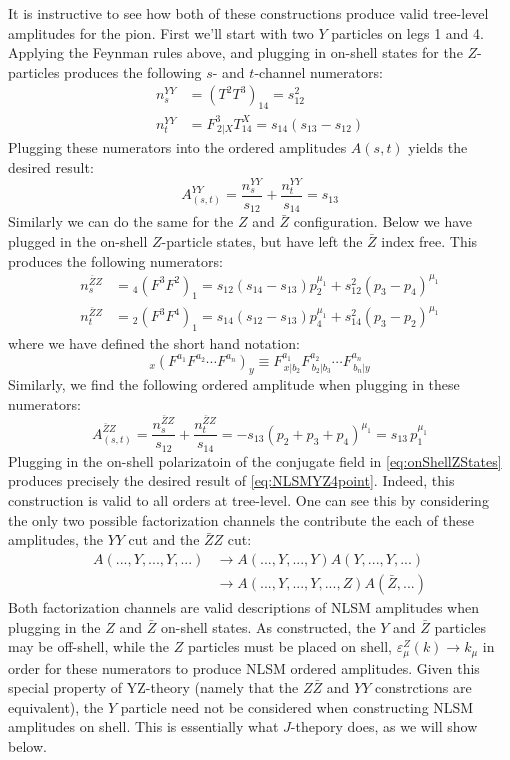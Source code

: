 \documentclass[11pt,letter]{article}
\def\be{\begin{equation}}
\begin{document}
It is instructive to see how both of these constructions produce valid tree-level amplitudes for the pion. First we'll start with two $Y$ particles on legs 1 and 4. Applying the Feynman rules above, and plugging in on-shell states for the $Z$-particles produces the following $s$- and $t$-channel numerators:
\begin{align}
n^{YY}_s &= (T^2T^3)_{14} = s_{12}^2 
\\
 n^{YY}_t &=  F^{3}_{\,2|X}T^X_{14}  = s_{14}(s_{13}-s_{12})
\end{align}
Plugging these numerators into the ordered amplitudes $A(s,t)$ yields the desired result:
\be\label{eq:NLSMYZ4point}
A^{YY}_{(s,t)} = \frac{n^{YY}_s}{s_{12}}+\frac{ n^{YY}_t }{s_{14}} = s_{13}
\end{equation}
Similarly we can do the same for the $Z$ and $\bar{Z}$ configuration. Below we have plugged in the on-shell $Z$-particle states, but have left the $\bar{Z}$ index free. This produces the following numerators:
\begin{align}
n^{\bar{Z}Z}_s &= {}_4(F^{3}F^{2})_{1} =  s_{12}(s_{14}-s_{13})p_2^{\mu_1}+s_{12}^2(p_3-p_4)^{\mu_1}
\\
 n^{\bar{Z}Z}_t &=   {}_2(F^{3}F^{4})_{1}  = s_{14}(s_{12}-s_{13})p_4^{\mu_1}+s_{14}^2(p_3-p_2)^{\mu_1}
\end{align}
where we have defined the short hand notation:
\begin{equation}
{}_x(F^{a_1}F^{a_2}\cdots F^{a_n})_{y} \equiv F^{a_1}_{\,x|b_2}F^{a_2}_{\,b_2|b_3}\cdots F^{a_n}_{\,b_n|y}
\end{equation}
Similarly, we find the following ordered amplitude when plugging in these numerators:
\begin{equation}
A^{\bar{Z}Z}_{(s,t)} = \frac{n^{\bar{Z}Z}_s}{s_{12}}+\frac{ n^{\bar{Z}Z}_t }{s_{14}} = -s_{13}(p_2+p_3+p_4)^{\mu_1} = s_{13} \,p_1^{\mu_1}
\end{equation}
Plugging in the on-shell polarizatoin of the conjugate field in \cref{eq:onShellZStates} produces precisely the desired result of \cref{eq:NLSMYZ4point}. Indeed, this construction is valid to all orders at tree-level. One can see this by considering the only two possible factorization channels the contribute the each of these amplitudes, the $YY$ cut and the $\bar{Z}Z$ cut:
\begin{align}
A(...,Y,...,Y,...) &\rightarrow A(...,Y,...,Y)A(Y,...,Y,...)
\\
&\rightarrow A(...,Y,...,Y,...,Z)A(\bar{Z},...)
\end{align}
Both factorization channels are valid descriptions of NLSM amplitudes when plugging in the $Z$ and $\bar{Z}$ on-shell states. As constructed, the $Y$ and $\bar{Z}$ particles may be off-shell, while the $Z$ particles must be placed on shell, $\varepsilon^Z_\mu(k)\rightarrow k_\mu$ in order for these numerators to produce NLSM ordered amplitudes. Given this special property of YZ-theory (namely that the $Z\bar{Z}$ and $YY$ constrctions are equivalent), the $Y$ particle need not be considered when constructing NLSM amplitudes on shell. This is essentially what $J$-thepory does, as we will show below.
\end{document}
